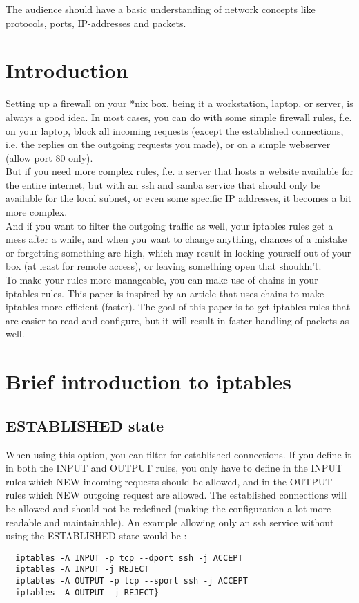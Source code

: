 \documentclass[a4paper,12pt]{article}
\begin{document}
The audience should have a basic understanding of network concepts like protocols, ports, IP-addresses and packets.

\pagebreak
\tableofcontents

\section{Introduction}
Setting up a firewall on your *nix box, being it a workstation, laptop, or server, is always a good idea. In most cases, you can do with some simple firewall rules, f.e. on your laptop, block all incoming requests (except the established connections, i.e. the replies on the outgoing requests you made), or on a simple webserver (allow port 80 only).\\

But if you need more complex rules, f.e. a server that hosts a website available for the entire internet, but with an ssh and samba service that should only be available for the local subnet, or even some specific IP addresses, it becomes a bit more complex.\\
And if you want to filter the outgoing traffic as well, your iptables rules get a mess after a while, and when you want to change anything, chances of a mistake or forgetting something are high, which may result in locking yourself out of your box (at least for remote access), or leaving something open that shouldn't.\\

To make your rules more manageable, you can make use of chains in your iptables rules. This paper is inspired by an article that uses chains to make iptables more efficient (faster). The goal of this paper is to get iptables rules that are easier to read and configure, but it will result in faster handling of packets as well.\\

\section{Brief introduction to iptables}
\subsection{ESTABLISHED state}
When using this option, you can filter for established connections. If you define it in both the INPUT and OUTPUT rules, you only have to define in the INPUT rules which NEW incoming requests should be allowed, and in the OUTPUT rules which NEW outgoing request are allowed. The established connections will be allowed and should not be redefined (making the configuration a lot more readable and maintainable). An example allowing only an ssh service without using the ESTABLISHED state would be :
\begin{verbatim}
  iptables -A INPUT -p tcp --dport ssh -j ACCEPT
  iptables -A INPUT -j REJECT
  iptables -A OUTPUT -p tcp --sport ssh -j ACCEPT
  iptables -A OUTPUT -j REJECT}
\end{verbatim}
\end{document}
